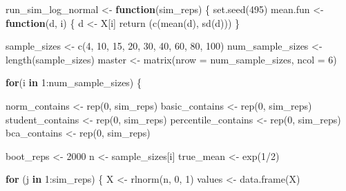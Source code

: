 \documentclass[12pt]{article}
\newenvironment{Shaded}{\begin{snugshade}}{\end{snugshade}}
\newcommand{\AttributeTok}[1]{\textcolor[rgb]{0.77,0.63,0.00}{#1}}
\newcommand{\ControlFlowTok}[1]{\textcolor[rgb]{0.13,0.29,0.53}{\textbf{#1}}}
\newcommand{\DecValTok}[1]{\textcolor[rgb]{0.00,0.00,0.81}{#1}}
\newcommand{\FunctionTok}[1]{\textcolor[rgb]{0.00,0.00,0.00}{#1}}
\newcommand{\NormalTok}[1]{#1}
\newcommand{\OtherTok}[1]{\textcolor[rgb]{0.56,0.35,0.01}{#1}}
\newcommand{\SpecialCharTok}[1]{\textcolor[rgb]{0.00,0.00,0.00}{#1}}
\begin{document}
\begin{Shaded}
\begin{Highlighting}[]
\NormalTok{run\_sim\_log\_normal }\OtherTok{\textless{}{-}} \ControlFlowTok{function}\NormalTok{(sim\_reps) \{}
  \FunctionTok{set.seed}\NormalTok{(}\DecValTok{495}\NormalTok{)}
\NormalTok{  mean.fun }\OtherTok{\textless{}{-}} \ControlFlowTok{function}\NormalTok{(d, i) \{}
\NormalTok{    d }\OtherTok{\textless{}{-}}\NormalTok{ X[i]}
    \FunctionTok{return}\NormalTok{ (}\FunctionTok{c}\NormalTok{(}\FunctionTok{mean}\NormalTok{(d), }\FunctionTok{sd}\NormalTok{(d)))}
\NormalTok{  \}}
  
\NormalTok{  sample\_sizes }\OtherTok{\textless{}{-}} \FunctionTok{c}\NormalTok{(}\DecValTok{4}\NormalTok{, }\DecValTok{10}\NormalTok{, }\DecValTok{15}\NormalTok{, }\DecValTok{20}\NormalTok{, }\DecValTok{30}\NormalTok{, }\DecValTok{40}\NormalTok{, }\DecValTok{60}\NormalTok{, }\DecValTok{80}\NormalTok{, }\DecValTok{100}\NormalTok{)}
\NormalTok{  num\_sample\_sizes }\OtherTok{\textless{}{-}} \FunctionTok{length}\NormalTok{(sample\_sizes)}
\NormalTok{  master }\OtherTok{\textless{}{-}} \FunctionTok{matrix}\NormalTok{(}\AttributeTok{nrow =}\NormalTok{ num\_sample\_sizes, }\AttributeTok{ncol =} \DecValTok{6}\NormalTok{)}
  
  \ControlFlowTok{for}\NormalTok{(i }\ControlFlowTok{in} \DecValTok{1}\SpecialCharTok{:}\NormalTok{num\_sample\_sizes) \{}
  
\NormalTok{    norm\_contains }\OtherTok{\textless{}{-}} \FunctionTok{rep}\NormalTok{(}\DecValTok{0}\NormalTok{, sim\_reps)}
\NormalTok{    basic\_contains }\OtherTok{\textless{}{-}} \FunctionTok{rep}\NormalTok{(}\DecValTok{0}\NormalTok{, sim\_reps)}
\NormalTok{    student\_contains }\OtherTok{\textless{}{-}} \FunctionTok{rep}\NormalTok{(}\DecValTok{0}\NormalTok{, sim\_reps)}
\NormalTok{    percentile\_contains }\OtherTok{\textless{}{-}} \FunctionTok{rep}\NormalTok{(}\DecValTok{0}\NormalTok{, sim\_reps)}
\NormalTok{    bca\_contains }\OtherTok{\textless{}{-}} \FunctionTok{rep}\NormalTok{(}\DecValTok{0}\NormalTok{, sim\_reps)}
    
\NormalTok{    boot\_reps }\OtherTok{\textless{}{-}} \DecValTok{2000}
\NormalTok{    n }\OtherTok{\textless{}{-}}\NormalTok{ sample\_sizes[i]}
\NormalTok{    true\_mean }\OtherTok{\textless{}{-}} \FunctionTok{exp}\NormalTok{(}\DecValTok{1}\SpecialCharTok{/}\DecValTok{2}\NormalTok{)}
    
    \ControlFlowTok{for}\NormalTok{ (j }\ControlFlowTok{in} \DecValTok{1}\SpecialCharTok{:}\NormalTok{sim\_reps) \{}
\NormalTok{      X }\OtherTok{\textless{}{-}} \FunctionTok{rlnorm}\NormalTok{(n, }\DecValTok{0}\NormalTok{, }\DecValTok{1}\NormalTok{)}
\NormalTok{      values }\OtherTok{\textless{}{-}} \FunctionTok{data.frame}\NormalTok{(X)}
    

\end{Highlighting}
\end{Shaded}
\end{document}

